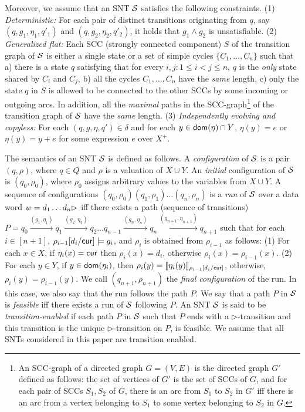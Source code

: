 Moreover, we assume that an SNT ${\mathcal{S} }$ satisfies the following constraints. (1) \emph{Deterministic:} For each pair of distinct transitions originating from $q$, say $(q, g_1, \eta_1,q'_1)$ and $(q, g_2,\eta_2,q'_2)$, it holds that $g_1 \wedge g_2$ is unsatisfiable. (2) \emph{Generalized flat:} Each SCC (strongly connected component) $S$ of the transition graph of ${\mathcal{S} }$ is either a single state or a set of simple cycles $\{C_1,\dots, C_n\}$ such that a) there is a state $q$ satisfying that for every $i,j: 1 \le i < j \le n$, $q$ is the \emph{only} state shared by $C_i$ and $C_j$, b) all the cycles $C_1,\dots, C_n$ have the \emph{same} length, c) only the state $q$ in $S$ is allowed to be connected to the other SCCs by some incoming or outgoing arcs. In addition, all the \emph{maximal} paths in the SCC-graph\footnote{An SCC-graph of a directed graph $G=(V,E)$ is the directed graph $G'$ defined as follows: the  set of vertices of $G'$ is the set of SCCs of $G$, and for each pair of SCCs $S_1, S_2$ of $G$, there is an arc from $S_1$ to $S_2$ in $G'$ iff there is an arc from a vertex belonging to $S_1$ to some vertex belonging to $S_2$ in $G$.} of the transition graph of ${\mathcal{S} }$ have the \emph{same} length. (3) \emph{Independently evolving and copyless:} For each $(q, g, \eta, q') \in \delta$ and for each $y \in \mathsf{dom}(\eta) \cap Y$, $\eta(y)=e$ or $\eta(y)=y+e$ for some expression $e$ over $X^+$.

The semantics of an SNT ${\mathcal{S} }$  is defined as follows. A \emph{configuration} of ${\mathcal{S} }$ is a pair $(q,\rho)$, where $q \in Q$ and $\rho$ is a valuation of $X \cup Y$. An \emph{initial} configuration of ${\mathcal{S} }$ is $(q_0,\rho_0)$, where $\rho_0$ assigns arbitrary values to the variables from $X\cup Y$.
A sequence of configurations $(q_0,\rho_0)(q_1,\rho_1)\ldots(q_n,\rho_n)$ is
a \emph{run} of ${\mathcal{S} }$ over a data word $w=d_1 \dots d_n \rhd$ iff there exists a path (sequence of transitions) $P=q_0 \xrightarrow{(g_1,\eta_1)} q_1 \xrightarrow{(g_2,\eta_2)} q_2 \dots q_{n-1} \xrightarrow{(g_n, \eta_n)} q_n \xrightarrow{(g_{n+1}, \eta_{n+1})} q_{n+1}$ such that for each $i \in [n+1]$, $\rho_{i-1}[d_i/\mathsf{cur}] \models g_i$, and $\rho_i$ is obtained from $\rho_{i-1}$ as follows: (1) For each $x \in X$, if $\eta_i(x)=\mathsf{cur}$ then $\rho_i(x)=d_i$,  otherwise $\rho_i(x)=\rho_{i-1}(x)$. (2) For each $y \in Y$, if $y \in \mathsf{dom}(\eta_i)$, then $\rho_i(y)=\llbracket\eta_i(y)\rrbracket_{\rho_{i-1}[d_i/\mathsf{cur}]}$, otherwise, $\rho_i(y)=\rho_{i-1}(y)$.
We call $(q_{n+1},\rho_{n+1})$ the \emph{final configuration} of the run. In this case, we also say that the run follows the path $P$.
We say that a path $P$ in ${\mathcal{S} }$ is \emph{feasible} iff there exists a run of ${\mathcal{S} }$ following $P$. 
An SNT ${\mathcal{S} }$ is said to be \emph{transition-enabled} if each path $P$ in ${\mathcal{S} }$ such that $P$ ends with a $\triangleright$-transition and this transition is the unique $\triangleright$-transition on $P$,  is feasible. We assume that all SNTs considered in this paper are transition enabled.

